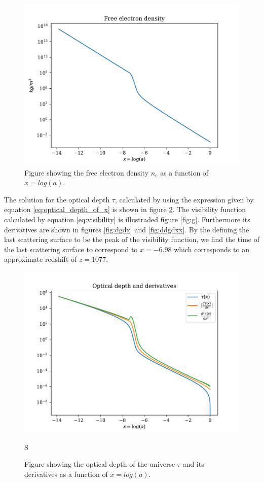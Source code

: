 \documentclass[onecolumn]{aastex62}
\begin{document}
\begin{figure}
    \includegraphics[scale=0.8]{figures/ne.pdf}
    \caption{Figure showing the free electron density $n_e$ as a function of $x=log(a)$.}
    \label{fig:ne}
\end{figure}
The solution for the optical depth $\tau$, calculated by using the expression given by equation \ref{eq:optical_depth_of_x} is shown in figure \ref{fig:tau}.
The visibility function calculated by equation \ref{eq:visibility} is illustraded figure \ref{fig:g}. Furthermore its derivatives are shown in figures \ref{fig:dgdx} and \ref{fig:ddgdxx}.
By the defining the last scattering surface to be the peak of the visibility function, we find the time of the last scattering surface to correspond to $x=-6.98$ which corresponds to an approximate redshift of $z=1077$.
\begin{figure}
    \includegraphics[scale=0.8]{figures/tau.pdf}
    \caption{Figure showing the optical depth of the universe $\tau$ and its derivatives as a function of $x=log(a)$.}S
    \label{fig:tau}
\end{figure}
\end{document}
